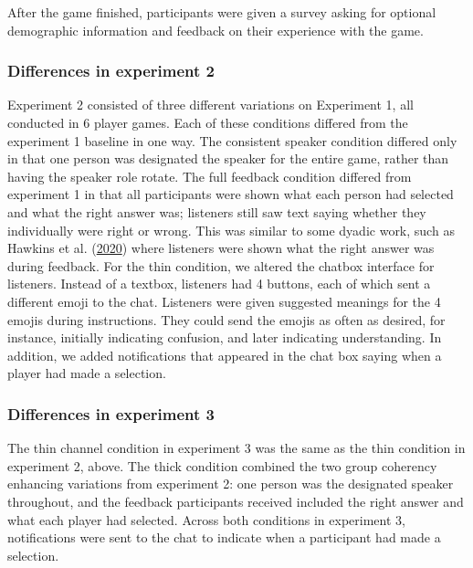 \documentclass[
  english,
  a4paper,
]{article}
\begin{document}
After the game finished, participants were given a survey asking for optional demographic information and feedback on their experience with the game.

\hypertarget{differences-in-experiment-2}{%
\subsubsection{Differences in experiment 2}\label{differences-in-experiment-2}}

Experiment 2 consisted of three different variations on Experiment 1, all conducted in 6 player games. Each of these conditions differed from the experiment 1 baseline in one way. The consistent speaker condition differed only in that one person was designated the speaker for the entire game, rather than having the speaker role rotate. The full feedback condition differed from experiment 1 in that all participants were shown what each person had selected and what the right answer was; listeners still saw text saying whether they individually were right or wrong. This was similar to some dyadic work, such as Hawkins et al. (\protect\hyperlink{ref-hawkinsCharacterizingDynamicsLearning2020}{2020}) where listeners were shown what the right answer was during feedback. For the thin condition, we altered the chatbox interface for listeners. Instead of a textbox, listeners had 4 buttons, each of which sent a different emoji to the chat. Listeners were given suggested meanings for the 4 emojis during instructions. They could send the emojis as often as desired, for instance, initially indicating confusion, and later indicating understanding. In addition, we added notifications that appeared in the chat box saying when a player had made a selection.

\hypertarget{differences-in-experiment-3}{%
\subsubsection{Differences in experiment 3}\label{differences-in-experiment-3}}

The thin channel condition in experiment 3 was the same as the thin condition in experiment 2, above. The thick condition combined the two group coherency enhancing variations from experiment 2: one person was the designated speaker throughout, and the feedback participants received included the right answer and what each player had selected. Across both conditions in experiment 3, notifications were sent to the chat to indicate when a participant had made a selection.
\end{document}

